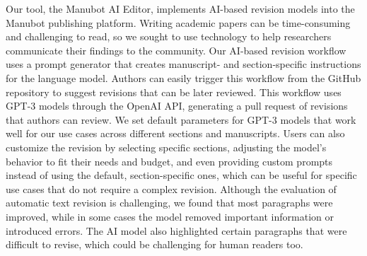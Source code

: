 \documentclass[
]{article}
\begin{document}
Our tool, the Manubot AI Editor, implements AI-based revision models into the Manubot publishing platform.
Writing academic papers can be time-consuming and challenging to read, so we sought to use technology to help researchers communicate their findings to the community.
Our AI-based revision workflow uses a prompt generator that creates manuscript- and section-specific instructions for the language model.
Authors can easily trigger this workflow from the GitHub repository to suggest revisions that can be later reviewed.
This workflow uses GPT-3 models through the OpenAI API, generating a pull request of revisions that authors can review.
We set default parameters for GPT-3 models that work well for our use cases across different sections and manuscripts.
Users can also customize the revision by selecting specific sections, adjusting the model's behavior to fit their needs and budget, and even providing custom prompts instead of using the default, section-specific ones, which can be useful for specific use cases that do not require a complex revision.
Although the evaluation of automatic text revision is challenging, we found that most paragraphs were improved, while in some cases the model removed important information or introduced errors.
The AI model also highlighted certain paragraphs that were difficult to revise, which could be challenging for human readers too.
\end{document}

